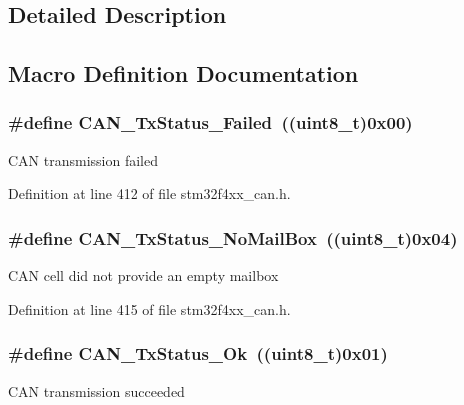 \subsection{Detailed Description}


\subsection{Macro Definition Documentation}
\hypertarget{group___c_a_n__transmit__constants_ga8d193002e76c04ec8caff6b110cd5983}{
\subsubsection[{C\-A\-N\-\_\-\-Tx\-Status\-\_\-\-Failed}]{\setlength{\rightskip}{0pt plus 5cm}\#define C\-A\-N\-\_\-\-Tx\-Status\-\_\-\-Failed~((uint8\-\_\-t)0x00)}}\label{group___c_a_n__transmit__constants_ga8d193002e76c04ec8caff6b110cd5983}
C\-A\-N transmission failed 

Definition at line 412 of file stm32f4xx\-\_\-can.\-h.

\hypertarget{group___c_a_n__transmit__constants_ga2620e99debd51011d3569121f2e44690}{
\subsubsection[{C\-A\-N\-\_\-\-Tx\-Status\-\_\-\-No\-Mail\-Box}]{\setlength{\rightskip}{0pt plus 5cm}\#define C\-A\-N\-\_\-\-Tx\-Status\-\_\-\-No\-Mail\-Box~((uint8\-\_\-t)0x04)}}\label{group___c_a_n__transmit__constants_ga2620e99debd51011d3569121f2e44690}
C\-A\-N cell did not provide an empty mailbox 

Definition at line 415 of file stm32f4xx\-\_\-can.\-h.

\hypertarget{group___c_a_n__transmit__constants_ga0b401c61922b1449de9b486dcf475c97}{
\subsubsection[{C\-A\-N\-\_\-\-Tx\-Status\-\_\-\-Ok}]{\setlength{\rightskip}{0pt plus 5cm}\#define C\-A\-N\-\_\-\-Tx\-Status\-\_\-\-Ok~((uint8\-\_\-t)0x01)}}\label{group___c_a_n__transmit__constants_ga0b401c61922b1449de9b486dcf475c97}
C\-A\-N transmission succeeded 


